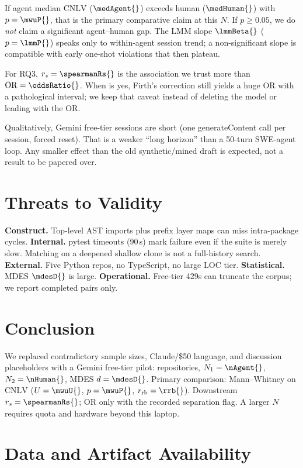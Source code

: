 \documentclass[11pt,letterpaper,logo]{yalearxiv}
\newcommand{\CNLV}{\mathrm{CNLV}}
\begin{document}
If agent median $\CNLV$ ($\medAgent{}$) exceeds human ($\medHuman{}$) with $p=\mwuP{}$, that is the primary comparative claim at this $N$. If $p\ge 0.05$, we do \emph{not} claim a significant agent--human gap. The LMM slope $\lmmBeta{}$ ($p=\lmmP{}$) speaks only to within-agent session trend; a non-significant slope is compatible with early one-shot violations that then plateau.

For RQ3, $r_s=\spearmanRs{}$ is the association we trust more than $\mathrm{OR}=\oddsRatio{}$. When \sepFlag{} is yes, Firth's correction still yields a huge OR with a pathological interval; we keep that caveat instead of deleting the model or leading with the OR.

Qualitatively, Gemini free-tier sessions are short (one generateContent call per session, forced reset). That is a weaker ``long horizon'' than a 50-turn SWE-agent loop. Any smaller effect than the old synthetic/mined draft is expected, not a result to be papered over.

\section{Threats to Validity}
\label{sec:threats}

\textbf{Construct.} Top-level AST imports plus prefix layer maps can miss intra-package cycles. \textbf{Internal.} pytest timeouts (90\,s) mark failure even if the suite is merely slow. Matching on a deepened shallow clone is not a full-history search. \textbf{External.} Five Python repos, no TypeScript, no large LOC tier. \textbf{Statistical.} MDES $\mdesD{}$ is large. \textbf{Operational.} Free-tier 429s can truncate the corpus; we report completed pairs only.

\section{Conclusion}
\label{sec:conclusion}

We replaced contradictory sample sizes, Claude/\$50 language, and discussion placeholders with a Gemini free-tier pilot: \nRepos{} repositories, $N_1=\nAgent{}$, $N_2=\nHuman{}$, MDES $d=\mdesD{}$. Primary comparison: Mann--Whitney on $\CNLV$ ($U=\mwuU{}$, $p=\mwuP{}$, $r_{\mathrm{rb}}=\rrb{}$). Downstream $r_s=\spearmanRs{}$; OR only with the recorded separation flag. A larger $N$ requires quota and hardware beyond this laptop.

\section{Data and Artifact Availability}
\label{sec:data}
\end{document}
